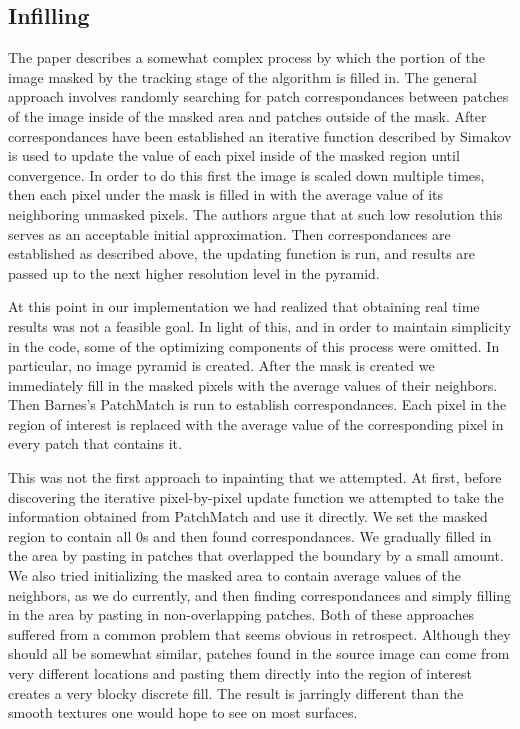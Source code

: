 \documentclass[12pt]{article}
\begin{document}
\subsection{Infilling}
The paper describes a somewhat complex process by which the portion of the image masked by the tracking stage of the algorithm is filled in. The general approach involves randomly searching for patch correspondances between patches of the image inside of the masked area and patches outside of the mask. After correspondances have been established an iterative function described by Simakov is used to update the value of each pixel inside of the masked region until convergence. In order to do this first the image is scaled down multiple times, then each pixel under the mask is filled in with the average value of its neighboring unmasked pixels. The authors argue that at such low resolution this serves as an acceptable initial approximation. Then correspondances are established as described above, the updating function is run, and results are passed up to the next higher resolution level in the pyramid. 

At this point in our implementation we had realized that obtaining real time results was not a feasible goal. In light of this, and in order to maintain simplicity in the code, some of the optimizing components of this process were omitted. In particular, no image pyramid is created. After the mask is created we immediately fill in the masked pixels with the average values of their neighbors. Then Barnes's PatchMatch is run to establish correspondances. Each pixel in the region of interest is replaced with the average value of the corresponding pixel in every patch that contains it. 

This was not the first approach to inpainting that we attempted. At first, before discovering the iterative pixel-by-pixel update function we attempted to take the information obtained from PatchMatch and use it directly. We set the masked region to contain all 0s and then found correspondances. We gradually filled in the area by pasting in patches that overlapped the boundary by a small amount. We also tried initializing the masked area to contain average values of the neighbors, as we do currently, and then finding correspondances and simply filling in the area by pasting in non-overlapping patches. Both of these approaches suffered from a common problem that seems obvious in retrospect. Although they should all be somewhat similar, patches found in the source image can come from very different locations and pasting them directly into the region of interest creates a very blocky discrete fill. The result is jarringly different than the smooth textures one would hope to see on most surfaces. 
\end{document}

